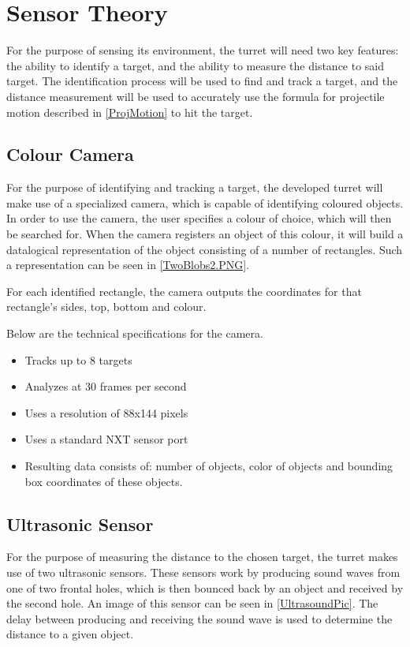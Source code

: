 \section{Sensor Theory}\label{SensorTheory}
For the purpose of sensing its environment, the turret will need two key
features: the ability to identify a target, and the ability to measure the
distance to said target. The identification process will be used to find and
track a target, and the distance measurement will be used to accurately use the
formula for projectile motion described in \autoref{ProjMotion} to hit the
target.

\subsection{Colour Camera}\label{SensTheoCam}
For the purpose of identifying and tracking a target, the developed turret will
make use of a specialized camera, which is capable of identifying coloured
objects. In order to use the camera, the user specifies a colour of choice,
which will then be searched for. When the camera registers an object of this
colour, it will build a datalogical representation of the object consisting of a
number of rectangles. Such a representation can be seen in
\autoref{TwoBlobs2.PNG}. 


For each identified rectangle, the camera outputs the coordinates for that
rectangle's sides, top, bottom and colour. 

Below are the technical specifications \citep[p. 1]{NXTCam} for the camera.
\begin{itemize}
  \item Tracks up to 8 targets
  \item Analyzes at 30 frames per second
  \item Uses a resolution of 88x144 pixels
  \item Uses a standard NXT sensor port
  \item Resulting data consists of: number of objects, color of objects and
  bounding box coordinates of these objects.
\end{itemize}

\subsection{Ultrasonic Sensor}\label{SensTheoUltra}
For the purpose of measuring the distance to the chosen target, the turret makes
use of two ultrasonic sensors. These sensors work by producing sound waves from
one of two frontal holes, which is then bounced back by an object and received
by the second hole. An image of this sensor can be seen in
\autoref{UltrasoundPic}. The delay between producing and receiving the sound
wave is used to determine the distance to a given object.

